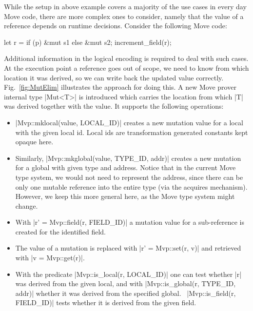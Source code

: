 
While the setup in above example covers a majority of the use cases in every day
Move code, there are more complex ones to consider, namely that the value of a
reference depends on runtime decisions. Consider the following Move code:

\begin{Move}
  let r = if (p) &mut s1 else &mut s2;
  increment_field(r);
\end{Move}

\noindent Additional information in the logical encoding is required to deal
with such cases. At the execution point a reference goes out of scope, we need
to know from which location it was derived, so we can write back the updated
value correctly. Fig.~\ref{fig:MutElim} illustrates the approach for doing
this. A new Move prover internal type |Mut<T>| is introduced which carries the
location from which |T| was derived together with the value. It supports the
following operations:

\begin{itemize}
\item |Mvp::mklocal(value, LOCAL_ID)| creates a new mutation value for a local
  with the given local id.  Local ids are transformation generated constants
  kept opaque here.
\item Similarly, |Mvp::mkglobal(value, TYPE_ID, addr)| creates a new
  mutation for a global with given type and address. Notice that in the
    current Move type system, we would not need to represent the address, since
    there can be only one mutable reference into the entire type (via the
    acquires mechanism). However, we keep this more general here, as the Move
    type system might change.
\item With |r' = Mvp::field(r, FIELD_ID)| a mutation value for a sub-reference is
  created for the identified field.
\item The value of a mutation is replaced with |r' = Mvp::set(r, v)| and
  retrieved with |v = Mvp::get(r)|.
\item With the predicate |Mvp::is_local(r, LOCAL_ID)| one can test whether |r|
  was derived from the given local, and with |Mvp::is_global(r, TYPE_ID, addr)|
  whether it was derived from the specified global.~%
  |Mvp::is_field(r, FIELD_ID)| tests whether it is derived from the given field.
\end{itemize}

